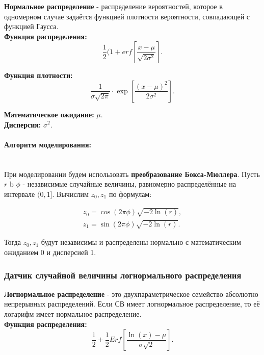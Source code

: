 \textbf{Нормальное распределение} -  распределение вероятностей, которое в одномерном случае задаётся функцией плотности вероятности, совпадающей с функцией Гаусса.\\

\textbf{Функция распределения:}
\begin{equation}
	\frac{1}{2}(1+erf\left[\frac{x-\mu}{\sqrt{2\sigma^{2}}}\right].
\end{equation}

\textbf{Функция плотности:}
\begin{equation}
	\frac{1}{\sigma\sqrt{2\pi}} \cdot \exp\left[\frac{(x-\mu)^{2}}{2\sigma^{2}}\right].
\end{equation}

\textbf{Математическое ожидание:} $\mu$.\\

\textbf{Дисперсия:} $\sigma^{2}$.

\paragraph{Алгоритм моделирования:}\
\\

При моделировании будем использовать \textbf{преобразование Бокса-Мюллера}. Пусть $r$ b $\phi$ - независимые случайные величины, равномерно распределённые на интервале $(0, 1]$. Вычислим $z_{0}, z_{1}$ по формулам:

\begin{equation}
	\begin{array}{l}
		z_{0} = \cos(2\pi\phi)\sqrt{-2\ln(r)}, \\
		z_{1} = \sin(2\pi\phi)\sqrt{-2\ln(r)}.
	\end{array}
\end{equation}

Тогда $z_{0}, z_{1}$ будут независимы и распределены нормально с математическим ожиданием 0 и дисперсией 1.

\subsubsection{Датчик случайной величины логнормального распределения}

\textbf{Логнормальное распределение} -  это двухпараметрическое семейство абсолютно непрерывных распределений. Если СВ имеет логнормальное распределение, то её логарифм имеет нормальное распределение.\\

\textbf{Функция распределения:}
\begin{equation}
	\frac{1}{2}+\frac{1}{2} Erf\left[\frac{\ln(x) - \mu}{\sigma\sqrt{2}}\right].
\end{equation}

